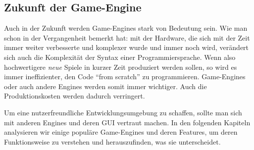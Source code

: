 \subsection{Zukunft der Game-Engine}

Auch in der Zukunft werden Game-Engines stark von Bedeutung sein. Wie man schon in der Vergangenheit bemerkt hat: mit der Hardware, die sich mit der Zeit immer weiter verbesserte und komplexer wurde und immer noch wird, verändert sich auch die Komplexität der Syntax einer Programmiersprache.
Wenn also hochwertigere \textit{neue} Spiele in kurzer Zeit produziert werden sollen, so wird es immer ineffizienter, den Code "`from scratch"' zu programmieren. Game-Engines oder auch andere Engines werden somit immer wichtiger. Auch die Produktionskosten werden dadurch verringert.

Um eine nutzerfreundliche Entwicklungsumgebung zu schaffen, sollte man sich mit anderen Engines und deren GUI vertraut machen. In den folgenden Kapiteln analysieren wir einige populäre Game-Engines und deren Features, um deren Funktionsweise zu verstehen und herauszufinden, was sie unterscheidet.
